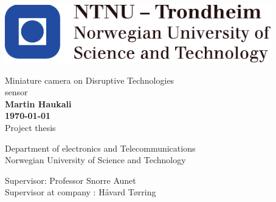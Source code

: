 \documentclass{article}
\date{September 2017}
\begin{document}
\begin {center}
\includegraphics[height=1in,keepaspectratio]{images/ntnu_logo.pdf}
\centering

\vspace*{5\baselineskip}
\LARGE Miniature camera on Disruptive Technologies \\
sensor\\


\normalfont
\small
\vspace*{5\baselineskip}
\textbf{Martin Haukali\\
\monthyeardate\today \\
}
\vspace*{5\baselineskip}
\LARGE Project thesis

\normalfont
\small
\vspace*{1\baselineskip}
Department of electronics and Telecommunications \\
Norwegian University of Science and Technology
\vspace*{1\baselineskip}

\vspace*{3\baselineskip}
\begin{flushleft}
Supervisor: Professor Snorre Aunet \\
Supervisor at company : Håvard Tørring \\
\end{flushleft}
\vspace*{3\baselineskip}




   
\end {center}
\thispagestyle{empty}
\newpage






\tableofcontents
\thispagestyle{empty}
\newpage














%


\end{document}
